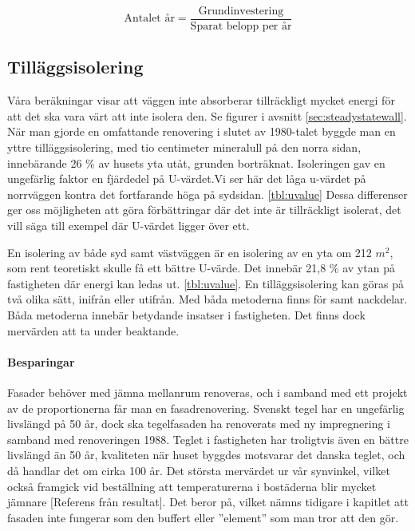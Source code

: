\begin{equation} \label{eq:payoff}
\text{Antalet år}=\frac{\text{Grundinvestering}}{\text{Sparat belopp per år}}
\end{equation}

\subsection{Tilläggsisolering}
Våra beräkningar visar att väggen inte absorberar tillräckligt mycket energi för att det ska vara värt att inte isolera den. Se figurer i avsnitt \ref{sec:steadystatewall}.
När man gjorde en omfattande renovering i slutet av 1980-talet byggde man en yttre tilläggsisolering, med tio centimeter mineralull på den norra sidan, \cite{arsredovisning} innebärande 26 \% av husets yta utåt, grunden borträknat. Isoleringen gav en ungefärlig faktor en fjärdedel på U-värdet.Vi ser här det låga u-värdet på norrväggen kontra det fortfarande höga på sydsidan. \ref{tbl:uvalue} Dessa differenser ger oss möjligheten att göra förbättringar där det inte är tillräckligt isolerat, det vill säga till exempel där U-värdet ligger över ett.

En isolering av både syd samt västväggen är en isolering av en yta om 212 $\unit{m^2}$, som rent teoretiskt skulle få ett bättre U-värde. Det innebär 21,8 \% av ytan på fastigheten där energi kan ledas ut. \ref{tbl:uvalue}.
En tilläggsisolering kan göras på två olika sätt, inifrån eller utifrån. Med båda metoderna finns för samt nackdelar. Båda metoderna innebär betydande insatser i fastigheten. Det finns dock mervärden att ta under beaktande. 

\paragraph{Besparingar}
Fasader behöver med jämna mellanrum renoveras, och i samband med ett projekt av de proportionerna får man en fasadrenovering. Svenskt tegel har en ungefärlig livslängd på 50 år\cite{magnus}, dock ska tegelfasaden ha renoverats med ny impregnering i samband med renoveringen 1988. Teglet i fastigheten har troligtvis även en bättre livslängd än 50 år, kvaliteten när huset byggdes motsvarar det danska teglet, och då handlar det om cirka 100 år. Det största mervärdet ur vår synvinkel, vilket också framgick vid beställning att temperaturerna i bostäderna blir mycket jämnare [Referens från resultat]. Det beror på, vilket nämns tidigare i kapitlet att fasaden inte fungerar som den buffert eller ”element” som man tror att den gör.

